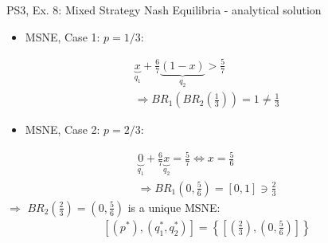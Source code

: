 \begin{frame}{PS3, Ex. 8: Mixed Strategy Nash Equilibria - analytical solution}
\begin{multicols}{2}
    \vspace{-8pt}
    \begin{itemize}
      \item MSNE, Case 1: $p=1/3:$
    \end{itemize}
    \vspace{-10pt}
    \begin{align*}
      \underbrace{x}_{q_1} + \frac{6}{7}\underbrace{(1-x)}_{q_2} > \frac{5}{7}\\
      \Rightarrow BR_1\left(BR_2\left(\frac{1}{3}\right)\right)=1\neq\frac{1}{3}
    \end{align*}
    \vspace{-12pt}
    \begin{itemize}
      \item MSNE, Case 2: $p=2/3:$
    \end{itemize}
    \vspace{-10pt}
    \begin{align*}
      \underbrace{0}_{q_1} + \frac{6}{7}\underbrace{x}_{q_2} = \frac{5}{7} \Leftrightarrow x=\frac{5}{6}\\
      \Rightarrow BR_1\left(0,\frac{5}{6}\right)=[0,1]\ni\frac{2}{3}
    \end{align*}
    $\Rightarrow$ $BR_2\left(\frac{2}{3}\right)=\left(0,\frac{5}{6}\right)$ is a unique MSNE:
    \vspace{-4pt}
    \begin{align*}
      \left[\left(p^{*}\right),\left(q_1^{*},q_2^{*}\right)\right]
      =\left\{\left[\left(\frac{2}{3}\right),\left(0,\frac{5}{6}\right)\right]\right\}
    \end{align*}
  \vfill\null
  \end{multicols}
\end{frame}




